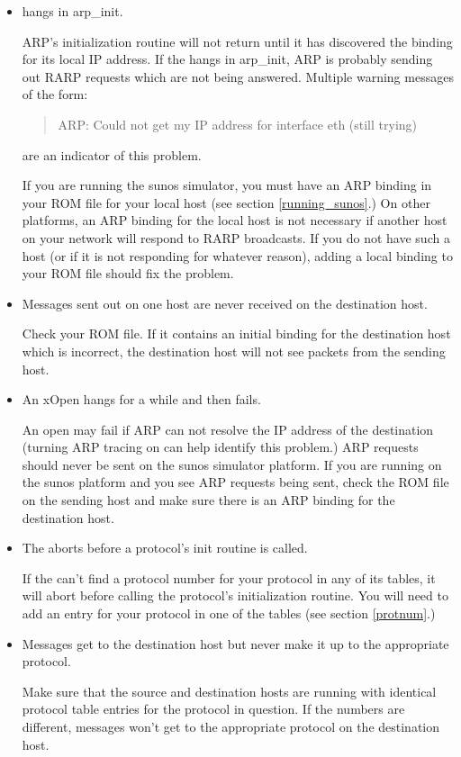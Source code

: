 \begin{itemize}

\item{}
\xk{} hangs in arp\_init. 

ARP's initialization routine will not return until it has discovered
the binding for its local IP address.  If the \xk{} hangs in
arp\_init, ARP is probably sending out RARP requests which are not
being answered.  Multiple warning messages of the form:

\begin{quote}
\begin{tt}
ARP: Could not get my IP address for interface eth (still trying)
\end{tt}
\end{quote}

are an indicator of this problem.

If you are running the sunos simulator, you must have
an ARP binding in your ROM file for your local host (see section
\ref{running_sunos}.)  On other platforms, an ARP binding for the local
host is not necessary if another host on your network will respond to
RARP broadcasts.  If you do not have such a host (or if it is not
responding for whatever reason), adding a local binding to your ROM
file should fix the problem.

\item{}
Messages sent out on one host are never received on the destination host.

Check your ROM file.  If it contains an initial binding for the
destination host which is incorrect, the destination host will not see
packets from the sending host.  

\item{}
An xOpen hangs for a while and then fails.

An open may fail if ARP can not resolve the IP address of the
destination (turning ARP tracing on can help identify this problem.)
ARP requests should never be sent on the sunos simulator platform.  If
you are running on the sunos platform and you see ARP requests being
sent, check the ROM file on the sending host and make sure there is an
ARP binding for the destination host.


\item{}
The \xk{} aborts before a protocol's init routine is called.

If the \xk{} can't find a protocol number for your protocol in any of
its tables, it will abort before calling the protocol's initialization
routine.  You will need to add an entry for your protocol in one of
the tables (see section \ref{protnum}.)

\item{}
Messages get to the destination host but never make it up to the
appropriate protocol.

Make sure that the source and destination hosts are running with
identical protocol table entries for the protocol in question.  If the
numbers are different, messages won't get to the appropriate protocol
on the destination host.

\end{itemize}